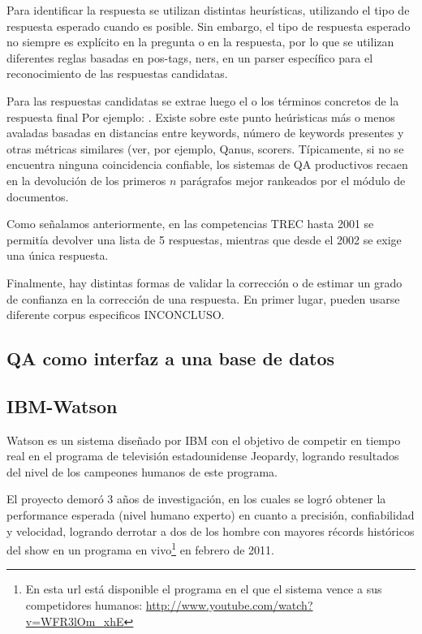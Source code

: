Para identificar la respuesta se utilizan distintas heurísticas, utilizando el tipo de respuesta esperado cuando es posible. Sin embargo, el tipo de respuesta esperado no siempre es explícito en la pregunta o en la respuesta, por lo que se utilizan diferentes reglas basadas en pos-tags, ners, en un parser específico para el reconocimiento de las respuestas candidatas.

Para las respuestas candidatas se extrae luego el o los términos concretos de la respuesta final {\color{red} Por ejemplo: }. Existe sobre este punto heúristicas más o menos avaladas basadas en distancias entre keywords, número de keywords presentes y otras métricas similares (ver, por ejemplo, {\color{red} Qanus, scorers}. Típicamente, si no se encuentra ninguna coincidencia confiable, los sistemas de QA productivos recaen en la devolución de los primeros $n$ parágrafos mejor rankeados por el módulo de documentos. 

Como señalamos anteriormente, en las competencias TREC hasta 2001 se permitía devolver una lista de 5 respuestas, mientras que desde el 2002 se exige una única respuesta.

Finalmente, hay distintas formas de validar la corrección o de estimar un grado de confianza en la corrección de una respuesta. En primer lugar, pueden usarse diferente corpus especificos {\color{red} INCONCLUSO}.

\subsection{QA como interfaz a una base de datos}
\label{subsec:closed-domain}

\subsection{IBM-Watson}
\label{subsec:ibm-watson}
Watson\cite{WATSON1}\cite{WATSON2} es un sistema diseñado por IBM con el objetivo de competir en
tiempo real en el programa de televisión estadounidense Jeopardy,
logrando resultados del nivel de los campeones humanos de este
programa.

El proyecto demoró 3 años de investigación, en los cuales se
logró obtener la performance esperada (nivel humano experto) en
cuanto a precisión, confiabilidad y velocidad, logrando derrotar a
dos de los hombre con mayores récords históricos del show en un
programa en vivo\footnote{En esta url está disponible el programa en el que el sistema vence a sus competidores humanos: \url{http://www.youtube.com/watch?v=WFR3lOm_xhE}} en febrero de 2011.


